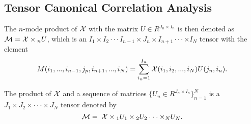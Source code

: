 \documentclass{sig-alternate-05-2015}
\begin{document}
\subsection{Tensor Canonical Correlation Analysis}
The $n$-mode product of ${\cal X}$ with the matrix $U \in {R^{{J_n} \times {I_n}}}$ is then denoted as ${\cal M} = {\cal X} \times {}_nU$, which is an ${I_1} \times {I_2} \cdot  \cdot  \cdot {I_{n - 1}} \times {J_n} \times {I_{n + 1}} \cdot  \cdot  \cdot  \times {I_N}$ tensor with the element
\begin{equation}\label{}
M({i_1},...,{i_{n - 1}},{j_p},{i_{n + 1}},...,{i_N})= \sum\limits_{{i_n} = 1}^{{I_n}} {{\cal X}({i_1},{i_2},...,{i_N})U({j_n},{i_n})}.
\end{equation}









The product of ${\cal X}$ and a sequence of matrices $\{ {U_n} \in {R^{{J_n} \times {I_n}}}\} _{n = 1}^N$ is a ${J_1} \times {J_2} \times  \cdot  \cdot  \cdot  \times {J_N}$ tensor denoted by
\begin{equation}\label{}
{\cal M} = \;{\cal X} \times {}_1{U_1} \times {}_2{U_2} \cdot  \cdot  \cdot  \times {}_N{U_N}.
\end{equation}


\end{document}
